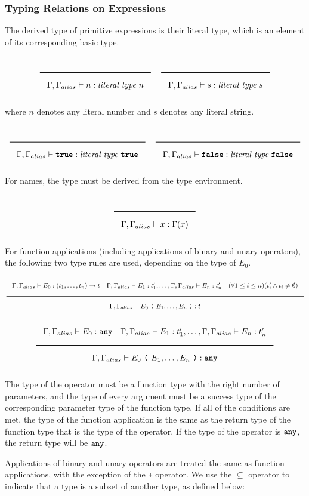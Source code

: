 \subsubsection{Typing Relations on Expressions}

The derived type of primitive expressions is their literal type, which is an element of its corresponding basic type.

\noindent
\[
  \Rule{}{\Gamma, \Gamma_{alias} \vdash n : \textit{literal type}\ n}
  \quad
  \Rule{}{\Gamma, \Gamma_{alias} \vdash s : \textit{literal type}\ s}
\]
\noindent

where $n$ denotes any literal number and $s$ denotes any literal string.

\noindent
\[
  \Rule{}{\Gamma, \Gamma_{alias} \vdash \TruE : \textit{literal type}\ \TruE}
  \quad
  \Rule{}{\Gamma, \Gamma_{alias} \vdash \FalsE : \textit{literal type}\ \FalsE}
\]
\noindent

For names, the type must be derived from the type environment.

\noindent
\[
  \Rule{}{\Gamma, \Gamma_{alias} \vdash x : \Gamma(x)}
\]
\noindent

For function applications (including applications of binary and unary operators), the following two type rules are used, depending on the type of $E_0$.

\noindent
\[
\Rule{\Gamma, \Gamma_{alias} \vdash E_0 : (t_1, \ldots, t_n) \rightarrow t \quad \Gamma, \Gamma_{alias} \vdash E_1 : t'_1, \ldots,  \Gamma, \Gamma_{alias} \vdash E_n : t'_n
  \quad (\forall 1 \leq i \leq n)(t'_i \wedge t_i \neq \emptyset)}{\Gamma, \Gamma_{alias} \vdash E_0\ \Lp \ E_1, \ldots, E_n\ \Rp : t}
\]
\noindent
\[
  \Rule{\Gamma, \Gamma_{alias} \vdash E_0 : \Any \quad \Gamma, \Gamma_{alias} \vdash E_1 : t'_1, \ldots, \Gamma, \Gamma_{alias} \vdash E_n : t'_n
    }{\Gamma, \Gamma_{alias} \vdash E_0\ \Lp \ E_1, \ldots, E_n\ \Rp : \Any}
\]
\noindent

The type of the operator must be a function type with the right number of parameters,
and the type of every argument must be a success type of the corresponding parameter type of the function type.
If all of the conditions are met, the type of the function application is the same
as the return type of the function type that is the type of the operator.
If the type of the operator is $\texttt{any}$, the return type will be $\texttt{any}$.

Applications of binary and unary operators are treated the same as function applications, with the exception of the \texttt{+} operator.
We use the $\subseteq$ operator to indicate that a type is a subset of another type, as defined below:

